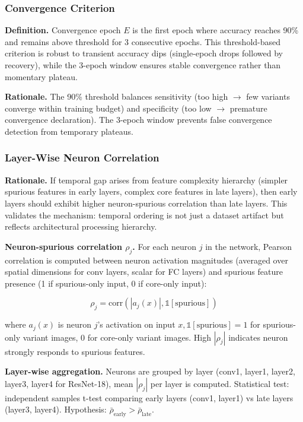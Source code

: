\subsubsection{Convergence Criterion}

\textbf{Definition.} Convergence epoch $E$ is the first epoch where accuracy reaches 90\% and remains above threshold for 3 consecutive epochs. This threshold-based criterion is robust to transient accuracy dips (single-epoch drops followed by recovery), while the 3-epoch window ensures stable convergence rather than momentary plateau.

\textbf{Rationale.} The 90\% threshold balances sensitivity (too high $\rightarrow$ few variants converge within training budget) and specificity (too low $\rightarrow$ premature convergence declaration). The 3-epoch window prevents false convergence detection from temporary plateaus.

\subsubsection{Layer-Wise Neuron Correlation}

\textbf{Rationale.} If temporal gap arises from feature complexity hierarchy (simpler spurious features in early layers, complex core features in late layers), then early layers should exhibit higher neuron-spurious correlation than late layers. This validates the mechanism: temporal ordering is not just a dataset artifact but reflects architectural processing hierarchy.

\textbf{Neuron-spurious correlation $\rho_j$.} For each neuron $j$ in the network, Pearson correlation is computed between neuron activation magnitudes (averaged over spatial dimensions for conv layers, scalar for FC layers) and spurious feature presence (1 if spurious-only input, 0 if core-only input):

$$\rho_j = \text{corr}(|a_j(x)|, \mathbb{1}[\text{spurious}])$$

where $a_j(x)$ is neuron $j$'s activation on input $x, \mathbb{1}[\text{spurious}] = 1$ for spurious-only variant images, $0$ for core-only variant images. High $|\rho_j|$ indicates neuron strongly responds to spurious features.

\textbf{Layer-wise aggregation.} Neurons are grouped by layer (conv1, layer1, layer2, layer3, layer4 for ResNet-18), mean $|\rho_j|$ per layer is computed. Statistical test: independent samples t-test comparing early layers (conv1, layer1) vs late layers (layer3, layer4). Hypothesis: $\bar{\rho}_{\text{early}} > \bar{\rho}_{\text{late}}$.

